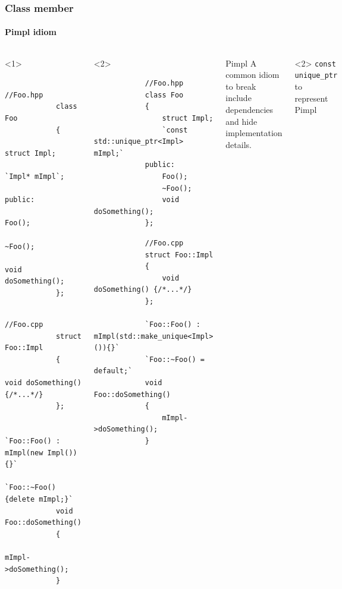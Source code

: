 \documentclass{beamer}
\begin{document}
\begin{frame}[fragile]
\frametitle{Class member}
\framesubtitle{Pimpl idiom}
	\begin{columns}
		\begin{onlyenv}<1>
		\begin{lstlisting}
			//Foo.hpp
			class Foo
			{
				struct Impl;
				`Impl* mImpl`;
			public:
				Foo();
				~Foo();
				void doSomething();			
			};
		\end{lstlisting}
        \hrulefill
		\begin{lstlisting}
			//Foo.cpp
			struct Foo::Impl
			{
				void doSomething() {/*...*/}
			};
			
			`Foo::Foo() : mImpl(new Impl()){}`
			`Foo::~Foo() {delete mImpl;}`
			void Foo::doSomething()
			{
				mImpl->doSomething();
			}
		\end{lstlisting}
		\end{onlyenv}
	
		\begin{onlyenv}<2>
		\begin{lstlisting}
			//Foo.hpp
			class Foo
			{
				struct Impl;
				`const std::unique_ptr<Impl> mImpl;`
			public:
				Foo();
				~Foo();
				void doSomething();			
			};
		\end{lstlisting}
        \hrulefill
		\begin{lstlisting}
			//Foo.cpp
			struct Foo::Impl
			{
				void doSomething() {/*...*/}
			};
			
			`Foo::Foo() : mImpl(std::make_unique<Impl>()){}`
			`Foo::~Foo() = default;`
			void Foo::doSomething()
			{
				mImpl->doSomething();
			}
		\end{lstlisting}
		\end{onlyenv}
		\begin{block}{Pimpl}
			A common idiom to break include dependencies and hide implementation details.
		\end{block}
		
		\begin{block}<2>{}
			\texttt{const unique\_ptr} to represent Pimpl
		\end{block}
	\end{columns}
\end{frame}
\end{document}
